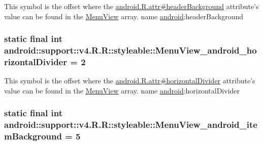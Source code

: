 This symbol is the offset where the \hyperlink{}{android.R.attr\#headerBackground} attribute's value can be found in the \hyperlink{classandroid_1_1support_1_1v4_1_1_r_1_1styleable_f27b70b4d764f1a1f59531c58e843a3b}{MenuView} array.  name \hyperlink{namespaceandroid}{android}:headerBackground \hypertarget{classandroid_1_1support_1_1v4_1_1_r_1_1styleable_c6c0a8c4be773bbaff1bdb2cd894c2ab}{
\subsubsection[{MenuView\_\-android\_\-horizontalDivider}]{\setlength{\rightskip}{0pt plus 5cm}static final int android::support::v4.R.R::styleable::MenuView\_\-android\_\-horizontalDivider = 2}}
\label{classandroid_1_1support_1_1v4_1_1_r_1_1styleable_c6c0a8c4be773bbaff1bdb2cd894c2ab}


This symbol is the offset where the \hyperlink{}{android.R.attr\#horizontalDivider} attribute's value can be found in the \hyperlink{classandroid_1_1support_1_1v4_1_1_r_1_1styleable_f27b70b4d764f1a1f59531c58e843a3b}{MenuView} array.  name \hyperlink{namespaceandroid}{android}:horizontalDivider \hypertarget{classandroid_1_1support_1_1v4_1_1_r_1_1styleable_9fd625d2301e72bc9b04d2fca592d709}{
\subsubsection[{MenuView\_\-android\_\-itemBackground}]{\setlength{\rightskip}{0pt plus 5cm}static final int android::support::v4.R.R::styleable::MenuView\_\-android\_\-itemBackground = 5}}
\label{classandroid_1_1support_1_1v4_1_1_r_1_1styleable_9fd625d2301e72bc9b04d2fca592d709}


